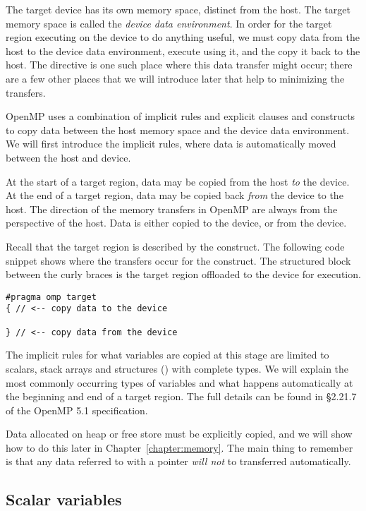 The target device has its own memory space, distinct from the host.
The target memory space is called the \emph{device data environment}.
In order for the target region executing on the device to do anything useful, we must copy data from the host to the device data environment, execute using it, and the copy it back to the host.
The  directive is one such place where this data transfer might occur; there are a few other places that we will introduce later that help to minimizing the transfers.

OpenMP uses a combination of implicit rules and explicit clauses and constructs to copy data between the host memory space and the device data environment.
We will first introduce the implicit rules, where data is automatically moved between the host and device.

At the start of a target region, data may be copied from the host \emph{to} the device.
At the end of a target region, data may be copied back \emph{from} the device to the host.
The direction of the memory transfers in OpenMP are always from the perspective of the host.
Data is either copied to the device, or from the device.

Recall that the target region is described by the  construct.
The following code snippet shows where the transfers occur for the  construct.
The structured block between the curly braces is the target region offloaded to the device for execution.
\begin{verbatim}
#pragma omp target
{ // <-- copy data to the device

} // <-- copy data from the device
\end{verbatim}

The implicit rules for what variables are copied at this stage are limited to scalars, stack arrays and structures () with complete types.
We will explain the most commonly occurring types of variables and what happens automatically at the beginning and end of a target region.
The full details can be found in \S2.21.7 of the OpenMP 5.1 specification.

Data allocated on heap or free store must be explicitly copied, and we will show how to do this later in Chapter~\ref{chapter:memory}.
The main thing to remember is that any data referred to with a pointer \emph{will not} to transferred automatically.

\subsection{Scalar variables}

